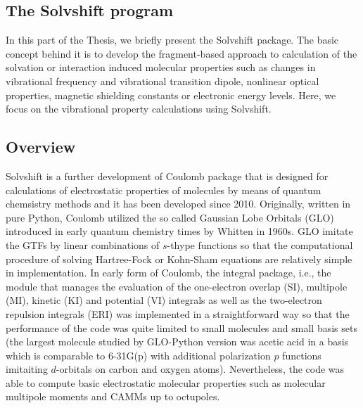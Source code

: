 \documentclass[a4paper,titlepage,twoside,fleqn,12pt]{book}
\begin{document}
\begin{refsection}
\chapter{The {\sc Solvshift} program}

In this part of the Thesis, we briefly present the {\sc Solvshift}
package. The basic concept behind it is to develop the fragment\hyp{}based
approach to calculation of the solvation or interaction induced
molecular properties such as changes in vibrational frequency and vibrational 
transition dipole, nonlinear optical properties, magnetic shielding
constants or electronic energy levels. Here, we focus on the
vibrational property calculations using {\sc Solvshift}.

\section{Overview}

{\sc Solvshift} is a further development of {\sc Coulomb} package
that is designed for calculations of electrostatic properties of molecules
by means of quantum chemsistry methods and it has been developed
since 2010. Originally, written in pure Python, {\sc Coulomb} utilized
the so called Gaussian Lobe Orbitals (GLO) introduced in early quantum chemistry
times by Whitten in 1960s. GLO imitate the GTFs by linear combinations
of $s$-thype functions so that the computational procedure of solving
Hartree\hyp{}Fock or Kohn\hyp{}Sham equations are relatively simple
in implementation. In early form of {\sc Coulomb}, the integral package, i.e.,
the module that manages the evaluation of the one\hyp{}electron overlap (SI), multipole (MI),
kinetic (KI) and
potential (VI) integrals as well as the two\hyp{}electron
repulsion integrals (ERI) was implemented in a straightforward way
so that the performance of the code was quite limited to small molecules
and small basis sets (the largest molecule studied by GLO\hyp{}Python version
was acetic acid in a basis which is comparable to 6-31G(p) with additional polarization
$p$ functions imitaiting $d$-orbitals on carbon and oxygen atoms). Nevertheless,
the code was able to compute basic electrostatic molecular properties such as
molecular multipole moments and CAMMs up to octupoles.
 

\end{refsection}
\end{document}

